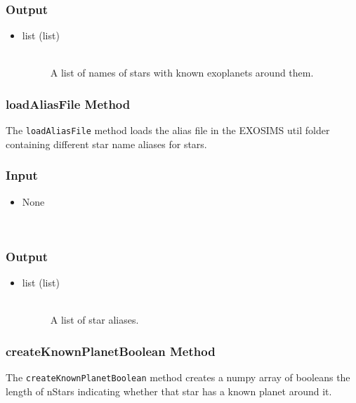 \documentclass[cleanfoot]{asme2ej}
\begin{document}
\subsubsection*{Output}
\begin{itemize}
\item
\begin{description}
    \item[list (list)] \hfill \\ A list of names of stars with known exoplanets around them.
\end{description}
\end{itemize}

\subsubsection{loadAliasFile Method} \label{sec:loadAliasFiletask}
The \verb+loadAliasFile+ method loads the alias file in the EXOSIMS util folder containing different star name aliases for stars.
\subsubsection*{Input}
\begin{itemize}
\item 
\begin{description}
    \item[None] \hfill \\
\end{description}
\end{itemize}
\subsubsection*{Output}
\begin{itemize}
\item
\begin{description}
    \item[list (list)] \hfill \\ A list of star aliases.
\end{description}
\end{itemize}

\subsubsection{createKnownPlanetBoolean Method} \label{sec:createKnownPlanetBooleantask}
The \verb+createKnownPlanetBoolean+ method creates a numpy array of booleans the length of nStars indicating whether that star has a known planet around it.
\end{document}
